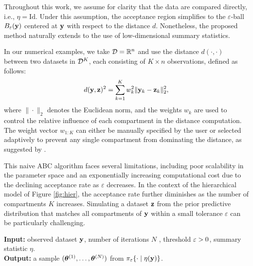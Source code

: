 Throughout this work, we assume for clarity that the data are compared directly, i.e., $\eta = \mathrm{Id}$. Under this assumption, the acceptance region simplifies to the $\varepsilon$-ball $B_{\varepsilon}(\mathbf{y})$ centered at $\mathbf{y}$ with respect to the distance $d$. Nonetheless, the proposed method naturally extends to the use of low-dimensional summary statistics.


In our numerical examples, we take $\mathcal{D} = \mathbb R^n$ and use the distance $d(\cdot,\cdot)$ between two datasets in \( \mathcal{D}^K \), each consisting of \( K \times n \) observations, defined as follows: 
\begin{equation}
    \label{eqdistance}
    d(\mathbf{y}, \mathbf{z})^2 = {\sum_{k=1}^K w_k^2 \| \mathbf{y}_k - \mathbf{z}_k \|_2^2},
\end{equation}
where \( \| \cdot \|_2 \) denotes the Euclidean norm, and the weights \( w_k \) are used to control the relative influence of each compartment in the distance computation. The weight vector \( w_{1:K} \) can either be manually specified by the user or selected adaptively to prevent any single compartment from dominating the distance, as suggested by \citet{prangle2017adapting}.


This naive ABC algorithm faces several limitations, including poor scalability in the parameter space and an exponentially increasing computational cost due to the declining acceptance rate as \( \varepsilon \) decreases. In the context of the hierarchical model of Figure \ref{fig:hier}, the acceptance rate further diminishes as the number of compartments \( K \) increases. Simulating a dataset \( \mathbf{z} \) from the prior predictive distribution that matches all compartments of \( \mathbf{y} \) within a small tolerance \( \varepsilon \) can be particularly challenging. 



\begin{algorithm}
\label{alg:abc_vanilla}
\caption{Vanilla Approximate Bayesian Computation}
\textbf{Input: }observed dataset $\mathbf{y}$, number of iterations $N$ , threshold $\varepsilon>0$, summary statistic $\eta$.\\
\textbf{Output: }a sample $(\boldsymbol{\theta}^{(1)}, \dots, \boldsymbol{\theta}^{(N)})$ from $\pi_\varepsilon\{\cdot\mid\eta(\mathbf{y})\}$.\\

\BlankLine

\end{algorithm}


